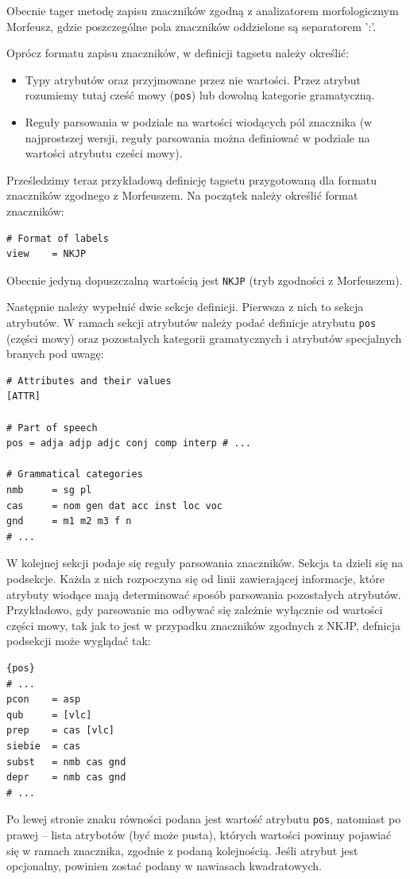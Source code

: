 \documentclass[a4paper,10]{article}
\begin{document}
Obecnie tager metodę zapisu znaczników zgodną z analizatorem morfologicznym
Morfeusz, gdzie poszczególne pola znaczników oddzielone są separatorem ':'.

Oprócz formatu zapisu znaczników, w definicji tagsetu należy określić:
\begin{itemize}
\item Typy atrybutów oraz przyjmowane przez nie wartości. Przez atrybut
rozumiemy tutaj cześć mowy (\verb|pos|) lub dowolną kategorie gramatyczną.
\item Reguły parsowania w podziale na wartości wiodących
pól znacznika (w najprostszej wersji, reguły parsowania można definiować
w podziale na wartości atrybutu cześci mowy).
\end{itemize}

Prześledzimy teraz przykładową definicję tagsetu przygotowaną
dla formatu znaczników zgodnego z Morfeuszem.
Na początek należy określić format znaczników:
\begin{verbatim}
# Format of labels 
view    = NKJP
\end{verbatim}
Obecnie jedyną dopuszczalną wartością jest \verb|NKJP| (tryb zgodności
z Morfeuszem).

Następnie należy wypełnić dwie sekcje definicji. Pierwsza z nich to sekcja
atrybutów. W ramach sekcji atrybutów należy podać definicje
atrybutu \verb|pos| (części mowy) oraz pozostałych kategorii
gramatycznych i atrybutów specjalnych branych pod uwagę:
\begin{verbatim}
# Attributes and their values
[ATTR]

# Part of speech
pos = adja adjp adjc conj comp interp # ...

# Grammatical categories
nmb     = sg pl
cas     = nom gen dat acc inst loc voc
gnd     = m1 m2 m3 f n
# ...
\end{verbatim}

W kolejnej sekcji podaje się reguły parsowania znaczników.
Sekcja ta dzieli się na podsekcje. Każda z nich rozpoczyna
się od linii zawierającej informacje, które atrybuty wiodące
mają determinować sposób parsowania pozostałych atrybutów.
Przykładowo, gdy parsowanie ma odbywać się zależnie wyłącznie
od wartości części mowy, tak jak to jest w przypadku znaczników
zgodnych z NKJP, defnicja podsekcji może wyglądać tak:
\begin{verbatim}
{pos}
# ...
pcon    = asp
qub     = [vlc]
prep    = cas [vlc]
siebie  = cas
subst   = nmb cas gnd
depr    = nmb cas gnd
# ...
\end{verbatim}
Po lewej stronie znaku równości podana jest wartość atrybutu \verb|pos|,
natomiast po prawej -- lista atrybotów (być może pusta), których wartości
powinny pojawiać się w ramach znacznika, zgodnie z podaną kolejnością.
Jeśli atrybut jest opcjonalny, powinien zostać podany w nawiasach kwadratowych.
\end{document}
